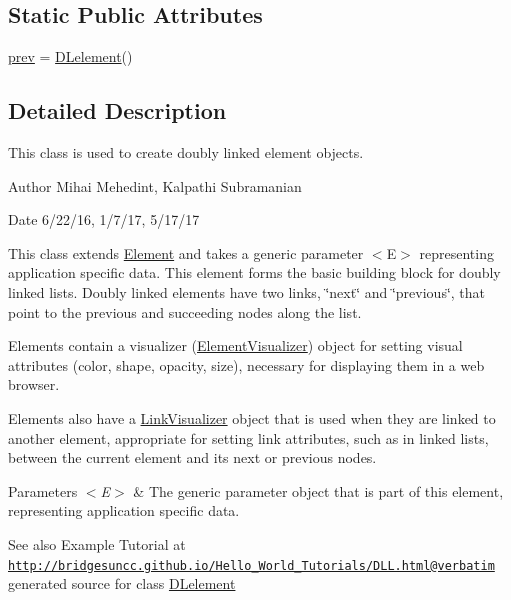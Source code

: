 \subsection*{Static Public Attributes}
\begin{DoxyCompactItemize}
\item 
\hyperlink{class_d_lelement_1_1_d_lelement_a14bf836d9e64de3f407da9bb7ba93622}{prev} = \hyperlink{class_d_lelement_1_1_d_lelement}{D\+Lelement}()
\end{DoxyCompactItemize}


\subsection{Detailed Description}
This class is used to create doubly linked element objects. 

\begin{DoxyAuthor}{Author}
Mihai Mehedint, Kalpathi Subramanian
\end{DoxyAuthor}
\begin{DoxyDate}{Date}
6/22/16, 1/7/17, 5/17/17
\end{DoxyDate}
This class extends \hyperlink{namespace_element}{Element} and takes a generic parameter $<$\+E$>$ representing application specific data. This element forms the basic building block for doubly linked lists. Doubly linked elements have two links, \char`\"{}next\char`\"{} and \char`\"{}previous\char`\"{}, that point to the previous and succeeding nodes along the list.

Elements contain a visualizer (\hyperlink{namespace_element_visualizer}{Element\+Visualizer}) object for setting visual attributes (color, shape, opacity, size), necessary for displaying them in a web browser.

Elements also have a \hyperlink{namespace_link_visualizer}{Link\+Visualizer} object that is used when they are linked to another element, appropriate for setting link attributes, such as in linked lists, between the current element and its next or previous nodes.


\begin{DoxyParams}{Parameters}
{\em $<$\+E$>$} & The generic parameter object that is part of this element, representing application specific data.\\
\hline
\end{DoxyParams}
\begin{DoxySeeAlso}{See also}
Example Tutorial at ~\newline
 \href{http://bridgesuncc.github.io/Hello_World_Tutorials/DLL.html@verbatim}{\tt http\+://bridgesuncc.\+github.\+io/\+Hello\+\_\+\+World\+\_\+\+Tutorials/\+D\+L\+L.\+html@verbatim} generated source for class \hyperlink{class_d_lelement_1_1_d_lelement}{D\+Lelement}  
\end{DoxySeeAlso}


